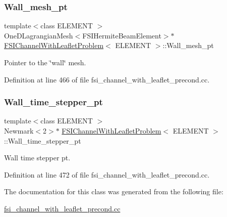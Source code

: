 \subsubsection{\texorpdfstring{Wall\+\_\+mesh\+\_\+pt}{Wall\_mesh\_pt}}
{\footnotesize\ttfamily template$<$class E\+L\+E\+M\+E\+NT $>$ \\
One\+D\+Lagrangian\+Mesh$<$F\+S\+I\+Hermite\+Beam\+Element$>$$\ast$ \hyperlink{classFSIChannelWithLeafletProblem}{F\+S\+I\+Channel\+With\+Leaflet\+Problem}$<$ E\+L\+E\+M\+E\+NT $>$\+::Wall\+\_\+mesh\+\_\+pt\hspace{0.3cm}{\ttfamily [private]}}



Pointer to the \char`\"{}wall\char`\"{} mesh. 



Definition at line 466 of file fsi\+\_\+channel\+\_\+with\+\_\+leaflet\+\_\+precond.\+cc.

\mbox{\label{classFSIChannelWithLeafletProblem_ace55d5753b8a32fcac448b8a45690afb}} 
\subsubsection{\texorpdfstring{Wall\+\_\+time\+\_\+stepper\+\_\+pt}{Wall\_time\_stepper\_pt}}
{\footnotesize\ttfamily template$<$class E\+L\+E\+M\+E\+NT $>$ \\
Newmark$<$2$>$$\ast$ \hyperlink{classFSIChannelWithLeafletProblem}{F\+S\+I\+Channel\+With\+Leaflet\+Problem}$<$ E\+L\+E\+M\+E\+NT $>$\+::Wall\+\_\+time\+\_\+stepper\+\_\+pt\hspace{0.3cm}{\ttfamily [private]}}



Wall time stepper pt. 



Definition at line 472 of file fsi\+\_\+channel\+\_\+with\+\_\+leaflet\+\_\+precond.\+cc.



The documentation for this class was generated from the following file\+:\begin{DoxyCompactItemize}
\item 
\hyperlink{fsi__channel__with__leaflet__precond_8cc}{fsi\+\_\+channel\+\_\+with\+\_\+leaflet\+\_\+precond.\+cc}\end{DoxyCompactItemize}
